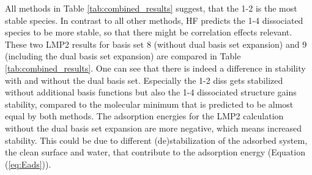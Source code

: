 \documentclass[11pt,DIV=13,BCOR=5mm,a4paper,headinclude]{scrbook}
\begin{document}
All methods in Table \ref{tab:combined_results} suggest, that the 1-2 is the most stable species.
In contrast to all other methods, HF predicts the 1-4 dissociated species to be more stable, so that there might be correlation effects relevant.
These two LMP2 results for basis set 8 (without dual basis set expansion) and 9 (including the dual basis set expansion) are compared in Table \ref{tab:combined_results}. %
One can see that there is indeed a difference in stability with and without the dual basis set.
Especially the 1-2 diss gets stabilized without additional basis functions but also the 1-4 dissociated structure gains stability, compared to the molecular minimum that is predicted to be almost equal by both methods.
The adsorption energies for the LMP2 calculation without the dual basis set expansion are more negative, which means increased stability.
This could be due to different (de)stabilization of the adsorbed system, the clean surface and water, that contribute to the adsorption energy (Equation (\ref{eq:Eads})). %
\end{document}
